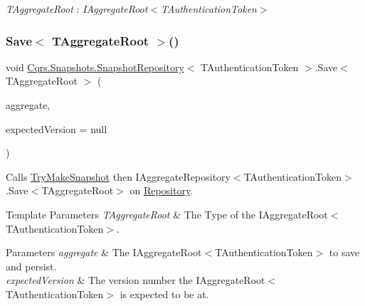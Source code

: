 \begin{Desc}
\item[Type Constraints]\begin{description}
\item[{\em T\+Aggregate\+Root} : {\em I\+Aggregate\+Root$<$T\+Authentication\+Token$>$}]\end{description}
\end{Desc}
\mbox{\label{classCqrs_1_1Snapshots_1_1SnapshotRepository_aac1a574562f8c6134d02a44cd10b8afa_aac1a574562f8c6134d02a44cd10b8afa}} 
\subsubsection{\texorpdfstring{Save$<$ T\+Aggregate\+Root $>$()}{Save< TAggregateRoot >()}}
{\footnotesize\ttfamily void \hyperlink{classCqrs_1_1Snapshots_1_1SnapshotRepository}{Cqrs.\+Snapshots.\+Snapshot\+Repository}$<$ T\+Authentication\+Token $>$.Save$<$ T\+Aggregate\+Root $>$ (\begin{DoxyParamCaption}\item[{T\+Aggregate\+Root}]{aggregate,  }\item[{int?}]{expected\+Version = {\ttfamily null} }\end{DoxyParamCaption})}



Calls \hyperlink{classCqrs_1_1Snapshots_1_1SnapshotRepository_a06b3211ded753ed79c3080819b16d496_a06b3211ded753ed79c3080819b16d496}{Try\+Make\+Snapshot} then I\+Aggregate\+Repository$<$\+T\+Authentication\+Token$>$.\+Save$<$\+T\+Aggregate\+Root$>$ on \hyperlink{classCqrs_1_1Snapshots_1_1SnapshotRepository_a64b1457cd45056fb7affd2aa8cd07d9e_a64b1457cd45056fb7affd2aa8cd07d9e}{Repository}. 


\begin{DoxyTemplParams}{Template Parameters}
{\em T\+Aggregate\+Root} & The Type of the I\+Aggregate\+Root$<$\+T\+Authentication\+Token$>$.\\
\hline
\end{DoxyTemplParams}

\begin{DoxyParams}{Parameters}
{\em aggregate} & The I\+Aggregate\+Root$<$\+T\+Authentication\+Token$>$ to save and persist.\\
\hline
{\em expected\+Version} & The version number the I\+Aggregate\+Root$<$\+T\+Authentication\+Token$>$ is expected to be at.\\
\hline
\end{DoxyParams}



